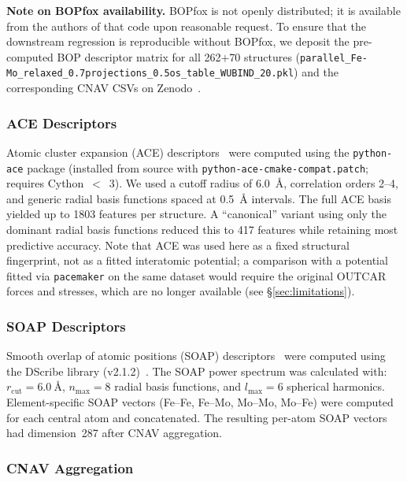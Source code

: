 \textbf{Note on BOPfox availability.} BOPfox is not openly distributed; it is available from the authors of that code upon reasonable request. To ensure that the downstream regression is reproducible without BOPfox, we deposit the pre-computed BOP descriptor matrix for all 262$+$70 structures (\texttt{parallel\_Fe-Mo\_relaxed\_0.7projections\_0.5os\_table\_WUBIND\_20.pkl}) and the corresponding CNAV CSVs on Zenodo~\cite{zenodo}.

\subsubsection*{ACE Descriptors}

Atomic cluster expansion (ACE) descriptors~\cite{ace} were computed using the \texttt{python-ace} package (installed from source with \texttt{python-ace-cmake-compat.patch}; requires Cython~$<$~3). We used a cutoff radius of \SI{6.0}{\angstrom}, correlation orders 2--4, and generic radial basis functions spaced at \SI{0.5}{\angstrom} intervals. The full ACE basis yielded up to 1803 features per structure. A ``canonical'' variant using only the dominant radial basis functions reduced this to 417 features while retaining most predictive accuracy. Note that ACE was used here as a fixed structural fingerprint, not as a fitted interatomic potential; a comparison with a potential fitted via \texttt{pacemaker} on the same dataset would require the original OUTCAR forces and stresses, which are no longer available (see \S\ref{sec:limitations}).

\subsubsection*{SOAP Descriptors}

Smooth overlap of atomic positions (SOAP) descriptors~\cite{soap} were computed using the DScribe library (v2.1.2)~\cite{dscribe}. The SOAP power spectrum was calculated with: $r_\text{cut} = \SI{6.0}{\angstrom}$, $n_\text{max} = 8$ radial basis functions, and $l_\text{max} = 6$ spherical harmonics. Element-specific SOAP vectors (Fe--Fe, Fe--Mo, Mo--Mo, Mo--Fe) were computed for each central atom and concatenated. The resulting per-atom SOAP vectors had dimension~287 after CNAV aggregation.

\subsubsection*{CNAV Aggregation}

